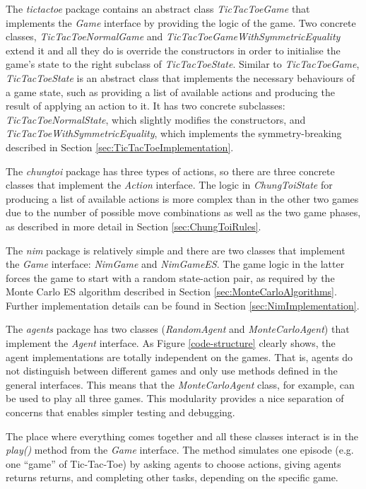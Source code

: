 \documentclass[11pt,a4paper]{report}
\begin{document}
The \emph{tictactoe} package contains an abstract class \emph{TicTacToeGame} that implements the \emph{Game} interface by providing the logic of the game. Two concrete classes, \emph{TicTacToeNormalGame} and \emph{TicTacToeGameWithSymmetricEquality} extend it and all they do is override the constructors in order to initialise the game's state to the right subclass of \emph{TicTacToeState}. Similar to \emph{TicTacToeGame}, \emph{TicTacToeState} is an abstract class that implements the necessary behaviours of a game state, such as providing a list of available actions and producing the result of applying an action to it. It has two concrete subclasses: \emph{TicTacToeNormalState}, which slightly modifies the constructors, and \emph{TicTacToeWithSymmetricEquality}, which implements the symmetry-breaking described in Section \ref{sec:TicTacToeImplementation}.

The \emph{chungtoi} package has three types of actions, so there are three concrete classes that implement the \emph{Action} interface. The logic in \emph{ChungToiState} for producing a list of available actions is more complex than in the other two games due to the number of possible move combinations as well as the two game phases, as described in more detail in Section \ref{sec:ChungToiRules}.

The \emph{nim} package is relatively simple and there are two classes that implement the \emph{Game} interface: \emph{NimGame} and \emph{NimGameES}. The game logic in the latter forces the game to start with a random state-action pair, as required by the Monte Carlo ES algorithm described in Section \ref{sec:MonteCarloAlgorithms}. Further implementation details can be found in Section \ref{sec:NimImplementation}.

The \emph{agents} package has two classes (\emph{RandomAgent} and \emph{MonteCarloAgent}) that implement the \emph{Agent} interface. As Figure \ref{code-structure} clearly shows, the agent implementations are totally independent on the games. That is, agents do not distinguish between different games and only use methods defined in the general interfaces. This means that the \emph{MonteCarloAgent} class, for example, can be used to play all three games. This modularity provides a nice separation of concerns that enables simpler testing and debugging.

The place where everything comes together and all these classes interact is in the \emph{play()} method from the \emph{Game} interface. The method simulates one episode (e.g. one ``game'' of Tic-Tac-Toe) by asking agents to choose actions, giving agents returns returns, and completing other tasks, depending on the specific game.
\end{document}
